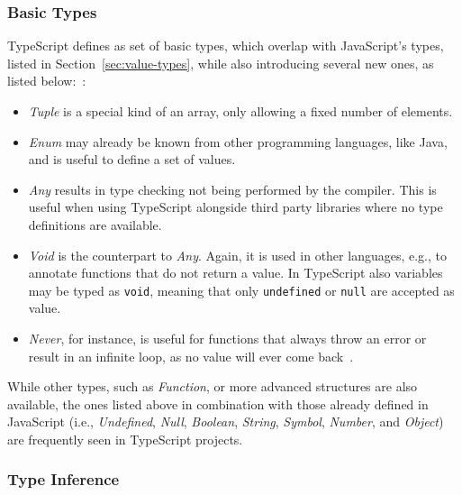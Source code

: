 \subsubsection{Basic Types}
\label{sec:ts-basic-types}

TypeScript defines as set of basic types, which overlap with JavaScript's types, listed in Section~\ref{sec:value-types}, while also introducing several new ones, as listed below:~\cite{TypeScriptHandbook:BasicTypes}:
\begin{itemize}
  \item \emph{Tuple} is a special kind of an array, only allowing a fixed number of elements.
  \item \emph{Enum} may already be known from other programming languages, like Java, and is useful to define a set of values.
  \item \emph{Any} results in type checking not being performed by the compiler. This is useful when using TypeScript alongside third party libraries where no type definitions are available.
  \item \emph{Void} is the counterpart to \emph{Any}. Again, it is used in other languages, e.g., to annotate functions that do not return a value. In TypeScript also variables may be typed as \texttt{void}, meaning that only \texttt{undefined} or \texttt{null} are accepted as value.
  \item \emph{Never}, for instance, is useful for functions that always throw an error or result in an infinite loop, as no value will ever come back~\cite{TypeScriptHandbook:BasicTypes}.
\end{itemize}
While other types, such as \emph{Function}, or more advanced structures are also available, the ones listed above in combination with those already defined in JavaScript (i.e., \emph{Undefined}, \emph{Null}, \emph{Boolean}, \emph{String}, \emph{Symbol}, \emph{Number}, and \emph{Object}) are frequently seen in TypeScript projects.

\subsubsection{Type Inference}
\label{sec:ts-type-inference}

